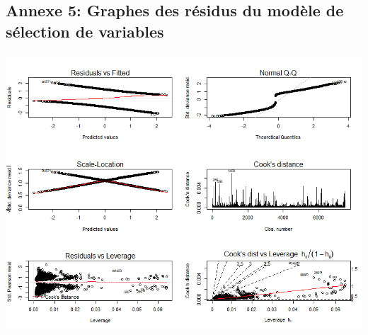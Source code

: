 \documentclass{book}
\begin{document}
\subsection{Annexe 5: Graphes des résidus du modèle de sélection de variables}
\includegraphics[scale=.8]{residuals_plot.png}






\end{document}
